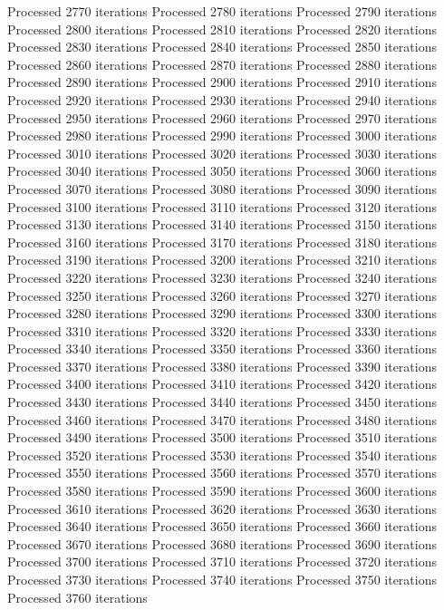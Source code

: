 \begin{pyprint}
Processed 2770 iterations
Processed 2780 iterations
Processed 2790 iterations
Processed 2800 iterations
Processed 2810 iterations
Processed 2820 iterations
Processed 2830 iterations
Processed 2840 iterations
Processed 2850 iterations
Processed 2860 iterations
Processed 2870 iterations
Processed 2880 iterations
Processed 2890 iterations
Processed 2900 iterations
Processed 2910 iterations
Processed 2920 iterations
Processed 2930 iterations
Processed 2940 iterations
Processed 2950 iterations
Processed 2960 iterations
Processed 2970 iterations
Processed 2980 iterations
Processed 2990 iterations
Processed 3000 iterations
Processed 3010 iterations
Processed 3020 iterations
Processed 3030 iterations
Processed 3040 iterations
Processed 3050 iterations
Processed 3060 iterations
Processed 3070 iterations
Processed 3080 iterations
Processed 3090 iterations
Processed 3100 iterations
Processed 3110 iterations
Processed 3120 iterations
Processed 3130 iterations
Processed 3140 iterations
Processed 3150 iterations
Processed 3160 iterations
Processed 3170 iterations
Processed 3180 iterations
Processed 3190 iterations
Processed 3200 iterations
Processed 3210 iterations
Processed 3220 iterations
Processed 3230 iterations
Processed 3240 iterations
Processed 3250 iterations
Processed 3260 iterations
Processed 3270 iterations
Processed 3280 iterations
Processed 3290 iterations
Processed 3300 iterations
Processed 3310 iterations
Processed 3320 iterations
Processed 3330 iterations
Processed 3340 iterations
Processed 3350 iterations
Processed 3360 iterations
Processed 3370 iterations
Processed 3380 iterations
Processed 3390 iterations
Processed 3400 iterations
Processed 3410 iterations
Processed 3420 iterations
Processed 3430 iterations
Processed 3440 iterations
Processed 3450 iterations
Processed 3460 iterations
Processed 3470 iterations
Processed 3480 iterations
Processed 3490 iterations
Processed 3500 iterations
Processed 3510 iterations
Processed 3520 iterations
Processed 3530 iterations
Processed 3540 iterations
Processed 3550 iterations
Processed 3560 iterations
Processed 3570 iterations
Processed 3580 iterations
Processed 3590 iterations
Processed 3600 iterations
Processed 3610 iterations
Processed 3620 iterations
Processed 3630 iterations
Processed 3640 iterations
Processed 3650 iterations
Processed 3660 iterations
Processed 3670 iterations
Processed 3680 iterations
Processed 3690 iterations
Processed 3700 iterations
Processed 3710 iterations
Processed 3720 iterations
Processed 3730 iterations
Processed 3740 iterations
Processed 3750 iterations
Processed 3760 iterations

\end{pyprint}
